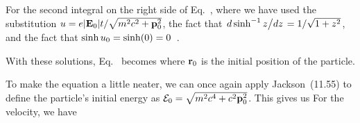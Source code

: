 {	For the second integral on the right side of Eq.~,
	where we have used the substitution $u = e \abs{\vb{E}_0} t / \sqrt{m^2 c^2 + \vb{p}_0^2}$, the fact that $\dv*{\sinh^{-1} z}{z} = 1 / \sqrt{1 + z^2}$, and the fact that $\sinh u_0 = \sinh(0) = 0$~\cite{Arcsinh}.
	
	With these solutions, Eq.~ becomes
	where $\vb{r}_0$ is the initial position of the particle.
	
	To make the equation a little neater, we can once again apply Jackson~(11.55) to define the particle's initial energy as $\mathcal{E}_0 = \sqrt{m^2 c^4 + c^2 \vb{p}_0^2}$.  This gives us
	For the velocity, we have
	\vfix
}

%
%


